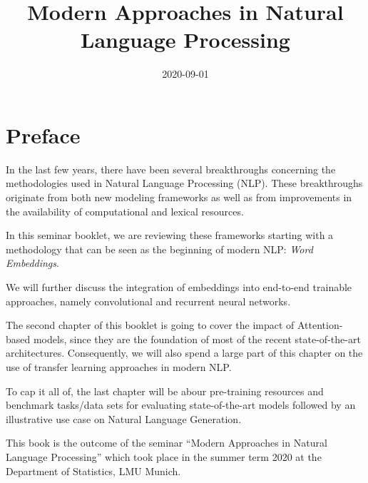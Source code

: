 \documentclass[]{krantz}
\title{Modern Approaches in Natural Language Processing}
\author{}
\date{\vspace{-2.5em}2020-09-01}
\begin{document}
\maketitle


\thispagestyle{empty}

\begin{center}
\end{center}

\setlength{\abovedisplayskip}{-5pt}
\setlength{\abovedisplayshortskip}{-5pt}

{
\hypersetup{linkcolor=}
\setcounter{tocdepth}{0}
\tableofcontents
}
\hypertarget{preface}{%
\chapter*{Preface}\label{preface}}


In the last few years, there have been several breakthroughs concerning the methodologies used in Natural Language Processing (NLP). These breakthroughs originate from both new modeling frameworks as well as from improvements in the availability of computational and lexical resources.

In this seminar booklet, we are reviewing these frameworks starting with a methodology that can be seen as the beginning of modern NLP: \emph{Word Embeddings}.

We will further discuss the integration of embeddings into end-to-end trainable approaches, namely convolutional and recurrent neural networks.

The second chapter of this booklet is going to cover the impact of Attention-based models, since they are the foundation of most of the recent state-of-the-art architectures. Consequently, we will also spend a large part of this chapter on the use of transfer learning approaches in modern NLP.

To cap it all of, the last chapter will be abour pre-training resources and benchmark tasks/data sets for evaluating state-of-the-art models followed by an illustrative use case on Natural Language Generation.

This book is the outcome of the seminar ``Modern Approaches in Natural Language Processing'' which took place in the summer term 2020 at the Department of Statistics, LMU Munich.
\end{document}
